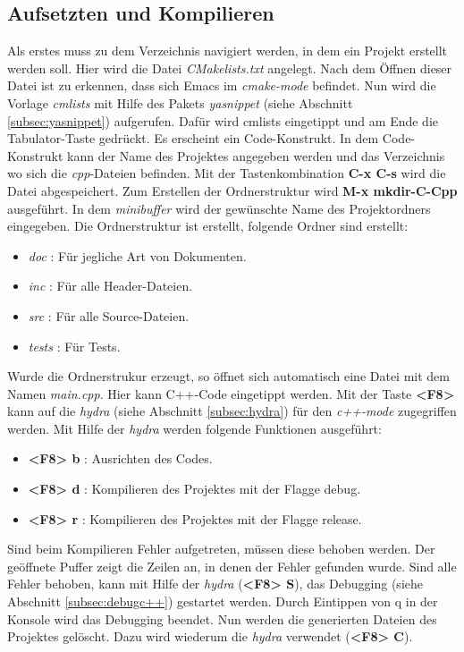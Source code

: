\subsection{Aufsetzten und Kompilieren}
\label{subsec:projc++}
Als erstes muss zu dem Verzeichnis navigiert werden, in dem ein
Projekt erstellt werden soll. Hier wird die Datei
\textit{CMakelists.txt} angelegt. Nach dem Öffnen dieser Datei ist zu
erkennen, dass sich Emacs im \textit{cmake-mode} befindet. Nun wird
die Vorlage \textit{cmlists} mit Hilfe des Pakets \textit{yasnippet}
(siehe Abschnitt \ref{subsec:yasnippet}) aufgerufen. Dafür wird
{\glqq}cmlists{\grqq} eingetippt und am Ende die Tabulator-Taste
gedrückt. Es erscheint ein Code-Konstrukt. In dem Code-Konstrukt kann
der Name des Projektes angegeben werden und das Verzeichnis wo sich
die \textit{cpp}-Dateien befinden. Mit der Tastenkombination
\textbf{C-x C-s} wird die Datei abgespeichert. Zum Erstellen der
Ordnerstruktur wird \textbf{M-x mkdir-C-Cpp} ausgeführt. In dem
\textit{minibuffer} wird der gewünschte Name des Projektordners
eingegeben. Die Ordnerstruktur ist erstellt, folgende Ordner sind
erstellt:
\begin{itemize}
\item \textit{doc} : Für jegliche Art von Dokumenten.
\item \textit{inc} : Für alle Header-Dateien.
\item \textit{src} : Für alle Source-Dateien.
\item \textit{tests} : Für Tests.
\end{itemize}
Wurde die Ordnerstrukur erzeugt, so öffnet sich automatisch eine Datei
mit dem Namen \textit{main.cpp}. Hier kann C++-Code eingetippt
werden. Mit der Taste \textbf{<F8>} kann auf die \textit{hydra} (siehe
Abschnitt \ref{subsec:hydra}) für den \textit{c++-mode} zugegriffen
werden. Mit Hilfe der \textit{hydra} werden folgende Funktionen
ausgeführt:
\begin{itemize}
\item \textbf{<F8> b} : Ausrichten des Codes.
\item \textbf{<F8> d} : Kompilieren des Projektes mit der Flagge
  {\glqq}debug{\glqq}.
\item \textbf{<F8> r} : Kompilieren des Projektes mit der Flagge
  {\glqq}release{\glqq}.
\end{itemize}
Sind beim Kompilieren Fehler aufgetreten, müssen diese behoben werden.
Der geöffnete Puffer zeigt die Zeilen an, in denen der Fehler gefunden
wurde. Sind alle Fehler behoben, kann mit Hilfe der \textit{hydra}
(\textbf{<F8> S}), das Debugging (siehe Abschnitt
\ref{subsec:debugc++}) gestartet werden. Durch Eintippen von
    {\glqq}q{\grqq} in der Konsole wird das Debugging beendet. Nun
    werden die generierten Dateien des Projektes gelöscht. Dazu wird
    wiederum die \textit{hydra} verwendet (\textbf{<F8> C}).\\

